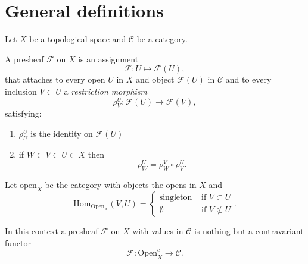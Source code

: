 \section{General definitions} \label{sec:general_definitions}

Let $X$ be a topological space and $\mathcal{C} $ be a category.

\begin{definition}
	A presheaf $\mathcal{F} $ on $X$ is an assignment \[
		\mathcal{F} : U \mapsto \mathcal{F} (U) 
	,\] 
	that attaches to every open $U$ in $X$ and object $\mathcal{F} (U)$ in $\mathcal{C} $ and to every inclusion $V \subset U$ a \emph{restriction morphism} \[
		\rho_V^{U}: \mathcal{F} (U) \to \mathcal{F}(V)
	,\]
	satisfying:
	\begin{enumerate}
		\item $\rho_{U}^{U}$ is the identity on $\mathcal{F} (U)$ 
		\item if $W \subset V\subset U \subset X$ then \[
		\rho_{W}^{U} = \rho _{W}^{V} \circ \rho_V^{U}
		.\] 
	\end{enumerate}
\end{definition}

\begin{definition}
	Let $\text{open}_X$ be the category with objects the opens in $X$ and \[
		\text{Hom}_{\text{Open}_X}(V,U) = \begin{cases}
			\text{singleton} & \text{ if } V \subset U\\
			\emptyset & \text{ if } V \not \subset U
		\end{cases}
	.\] 

	In this context a presheaf $\mathcal{F} $ on $X$ with values in $\mathcal{C} $ is nothing but a contravariant functor \[
	\mathcal{F} : \text{Open}_X^{c} \to \mathcal{C} 
	.\] 
\end{definition}

